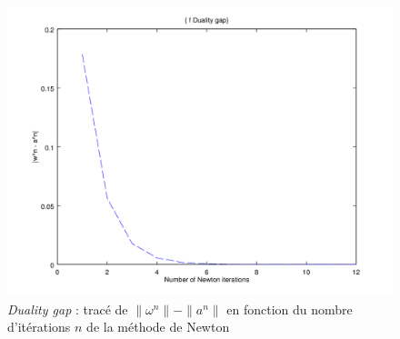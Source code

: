 \documentclass{article}
\begin{document}
         \begin{figure}
           \begin{center}
             \includegraphics[scale=0.5]{images/duality5.png}
             \caption{\emph{Duality gap} : tracé de $\|\omega^n\| - \|a^n\|$ en fonction du nombre d'itérations $n$ de la méthode de Newton}
           \end{center}
         \end{figure}
\end{document}
